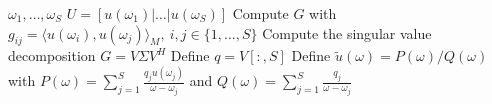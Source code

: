 \begin{algorithmic}
    \Require $\omega_1, \dots, \omega_S$
    \Require $U = [u(\omega_1) | \dots | u(\omega_S)]$ 
    \State Compute $G$ with $g_{ij} = \langle u(\omega_i), u(\omega_j)\rangle_M,~ i, j \in \{1, \dots, S \}$ 
    \State Compute the singular value decomposition $G = V \Sigma V^H$
    \State Define $q = V[:, S]$
    \State Define $\tilde{u}(\omega) = P(\omega) / Q(\omega)$ with $P(\omega) = \sum_{j=1}^S \frac{q_j u(\omega_j)}{\omega - \omega_j}$ and $Q(\omega) = \sum_{j=1}^S \frac{q_j}{\omega - \omega_j}$
\end{algorithmic}